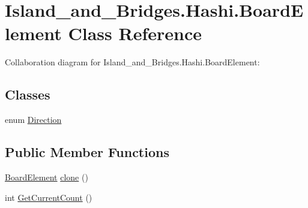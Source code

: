 \hypertarget{class_island__and___bridges_1_1_hashi_1_1_board_element}{}\section{Island\+\_\+and\+\_\+\+Bridges.\+Hashi.\+Board\+Element Class Reference}
\label{class_island__and___bridges_1_1_hashi_1_1_board_element}


Collaboration diagram for Island\+\_\+and\+\_\+\+Bridges.\+Hashi.\+Board\+Element\+:
\subsection*{Classes}
\begin{DoxyCompactItemize}
\item 
enum \mbox{\hyperlink{enum_island__and___bridges_1_1_hashi_1_1_board_element_1_1_direction}{Direction}}
\end{DoxyCompactItemize}
\subsection*{Public Member Functions}
\begin{DoxyCompactItemize}
\item 
\mbox{\hyperlink{class_island__and___bridges_1_1_hashi_1_1_board_element}{Board\+Element}} \mbox{\hyperlink{class_island__and___bridges_1_1_hashi_1_1_board_element_a815ee8cb7478381ad3398c07e0a14d3b}{clone}} ()
\item 
int \mbox{\hyperlink{class_island__and___bridges_1_1_hashi_1_1_board_element_aa377c313875e3e490b0e52db9ebae89c}{Get\+Current\+Count}} ()
\end{DoxyCompactItemize}

